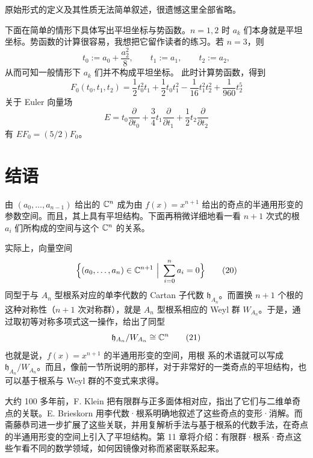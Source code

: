 原始形式的定义及其性质无法简单叙述，很遗憾这里全部省略。

下面在简单的情形下具体写出平坦坐标与势函数。$n=1,2$ 时 $a_k$ 们本身就是平坦坐标。势函数的计算很容易，我想把它留作读者的练习。若 $n=3$，则
\[
  t_0:=a_0+\frac{a_2^2}{8},\qquad t_1:=a_1,\qquad t_2:=a_2,
\]
从而可知一般情形下 $a_k$ 们并不构成平坦坐标。%
此时计算势函数，得到
\begin{equation}
  F_0(t_0,t_1,t_2)=\frac{1}{2}t_0^2t_1+\frac{1}{2}t_0t_1^2-\frac{1}{16}t_1^2t_2^2+\frac{1}{960}t_2^5
  \tag{19}
\end{equation}
关于 Euler 向量场
\[
  E=t_0\frac{\partial}{\partial t_0}+\frac{3}{4}t_1\frac{\partial}{\partial t_1}+\frac{1}{2}t_2\frac{\partial}{\partial t_2}
\]
有 $EF_0=(5/2)F_0$。

\section{结语}

由 $(a_0,\dots,a_{n-1})$ 给出的 $\mathbb{C}^n$ 成为由 $f(x)=x^{n+1}$ 给出的奇点的半通用形变的参数空间。而且，其上具有平坦结构。下面再稍微详细地看一看 $n+1$ 次式的根 $a_i$ 们所构成的空间与这个 $\mathbb{C}^n$ 的关系。

实际上，向量空间
\begin{equation}
  \Bigl\{(a_0,\dots,a_n)\in\C^{n+1}\ \Big|\ \sum_{i=0}^{n}a_i=0\Bigr\}
  \tag{20}
\end{equation}
同型于与 $A_n$ 型根系对应的单李代数的 Cartan 子代数 $\mathfrak{h}_{A_n}$。而置换 $n+1$ 个根的这种对称性（$n+1$ 次对称群），就是 $A_n$ 型根系相应的 Weyl 群 $W_{A_n}$。于是，通过取初等对称多项式这一操作，给出了同型
\begin{equation}
  \mathfrak{h}_{A_n}/W_{A_n}\cong\mathbb{C}^n
  \tag{21}
\end{equation}
也就是说，$f(x)=x^{n+1}$ 的半通用形变的空间，用根
系的术语就可以写成 $\mathfrak{h}_{A_n}/W_{A_n}$。而且，像前一节所说明的那样，对于非常好的一类奇点的平坦结构，也可以基于根系与 Weyl 群的不变式来求得。

大约 100 多年前，F. Klein 把有限群与正多面体相对应，指出了它们与二维单奇点的关联。E. Brieskorn 用李代数·根系明确地叙述了这些奇点的变形·消解。而斋藤恭司进一步扩展了这些关联，并用复解析手法与基于根系的代数手法，在奇点的半通用形变的空间上引入了平坦结构。第 11 章将介绍：有限群·根系·奇点这些乍看不同的数学领域，如何因镜像对称而紧密联系起来。

